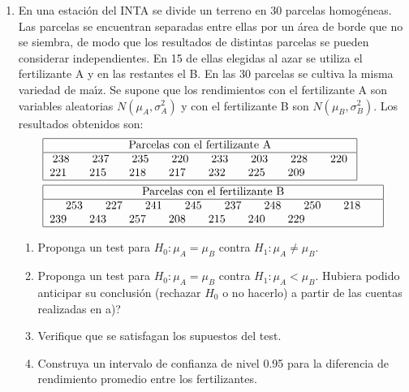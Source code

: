 \documentclass[11pt,a4paper,twoside]{article}%
\begin{document}
\begin{enumerate}
\item En una estaci\'{o}n del INTA se divide un terreno en 30 parcelas
homog\'{e}neas. Las parcelas se encuentran separadas entre ellas por un
\'{a}rea de borde que no se siembra, de modo que los resultados de distintas
parcelas se pueden considerar independientes. En 15 de ellas elegidas al azar
se utiliza el fertilizante A y en las restantes el B. En las 30 parcelas se
cultiva la misma variedad de ma\'{\i}z. Se supone que los rendimientos con el
fertilizante A son variables aleatorias $N(\mu_{A},\sigma_{A}^{2})$ y con el
fertilizante B son $N(\mu_{B},\sigma_{B}^{2})$. Los resultados obtenidos son:%
\begin{align*}
&
\begin{tabular}
[c]{|c|}\hline
Parcelas con el fertilizante A\\\hline
238\qquad237\qquad235\qquad220\qquad233\qquad203\qquad228\qquad220\qquad\\
221\qquad215\qquad218\qquad217\qquad232\qquad225\qquad209\qquad\qquad
\qquad\\\hline
\end{tabular}
\\
&
\begin{tabular}
[c]{|c|}\hline
Parcelas con el fertilizante B\\\hline
253\qquad227\qquad241\qquad245\qquad237\qquad248\qquad250\qquad218\qquad\\
239\qquad243\qquad257\qquad208\qquad215\qquad240\qquad229
\ \ \ \ \ \ \ \ \ \ \ \ \ \ \ \ \ \ \ \\\hline
\end{tabular}
\end{align*}


\begin{enumerate}
\item Proponga un test para $H_{0}:\mu_{A}=\mu_{B}$ contra $H_{1}:\mu_{A}%
\neq\mu_{B}$.

\item Proponga un test para $H_{0}:\mu_{A}=\mu_{B}$ contra $H_{1}:\mu_{A}%
<\mu_{B}$. \textquestiondown Hubiera podido anticipar su conclusi\'{o}n
(rechazar $H_{0}$ o no hacerlo) a partir de las cuentas realizadas en a)?

\item Verifique que se satisfagan los supuestos del test.

\item Construya un intervalo de confianza de nivel 0.95 para la diferencia de
rendimiento promedio entre los fertilizantes.


\end{enumerate}
\end{enumerate}
\end{document}
